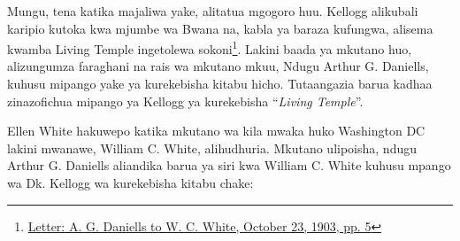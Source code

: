 Mungu, tena katika majaliwa yake, alitatua mgogoro huu. Kellogg alikubali karipio kutoka kwa mjumbe wa Bwana na, kabla ya baraza kufungwa, alisema kwamba Living Temple ingetolewa sokoni\footnote{\href{https://forgottenpillar.com/wp-content/uploads/2022/04/Letter-A-G-Daniells-to-W-C-White-October-29-1903.pdf}{Letter: A. G. Daniells to W. C. White, October 23, 1903, pp. 5}}. Lakini baada ya mkutano huo, alizungumza faraghani na rais wa mkutano mkuu, Ndugu Arthur G. Daniells, kuhusu mipango yake ya kurekebisha kitabu hicho. Tutaangazia barua kadhaa zinazofichua mipango ya Kellogg ya kurekebisha “\textit{Living Temple}”.


Ellen White hakuwepo katika mkutano wa kila mwaka huko Washington DC lakini mwanawe, William C. White, alihudhuria. Mkutano ulipoisha, ndugu Arthur G. Daniells aliandika barua ya siri kwa William C. White kuhusu mpango wa Dk. Kellogg wa kurekebisha kitabu chake:









